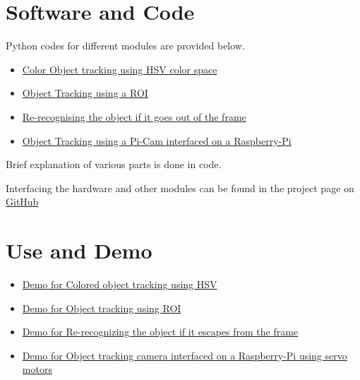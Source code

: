 \documentclass[a4paper,12pt,oneside]{book}
\begin{document}
\section{Software and Code}
Python codes for different modules are provided below.
\begin{itemize}
    \item \href{https://github.com/eYSIP-2016/Object-Tracking-Camera/blob/master/Tutorials/1.%20Colored%20object%20tracking%20using%20HSV/Colored_object_tracking_using_HSV.py}{Color Object tracking using HSV color space}
    \item \href{https://github.com/eYSIP-2016/Object-Tracking-Camera/blob/master/Tutorials/2.%20Object%20tracking%28Based%20on%20ROI%29/Colored_Object_tracking_based_on_ROI_selection.py}{Object Tracking using a ROI}
    \item \href{https://github.com/eYSIP-2016/Object-Tracking-Camera/blob/master/Tutorials/4.%20Re-recognizing%20the%20object%20if%20it%20escapes%20and%20comes%20back%20into%20the%20frame.%20Tutorial%20on%20algorithm%20used/code.py}{Re-recognising the object if it goes out of the frame}
    \item \href{https://github.com/eYSIP-2016/Object-Tracking-Camera/blob/master/Tutorials/6.%20Object%20%20Tracking%20using%20a%20Pi-Cam%20interfaced%20on%20a%20Raspberry-Pi/code.py}{Object Tracking using a Pi-Cam interfaced on a Raspberry-Pi}
\end{itemize}
Brief explanation of various parts is done in code.

Interfacing the hardware and other modules can be found in the project page on \href{https://github.com/eYSIP-2016/Object-Tracking-Camera}{GitHub}

\section{Use and Demo}
\begin{itemize}
    \item \href{https://youtu.be/hWcxEkWLm9o}{Demo for Colored object tracking using HSV }
    \item \href{https://youtu.be/bytE1EegAfg}{Demo for Object tracking using ROI}
    \item \href {https://youtu.be/M2SsABMLuCQ}{Demo for Re-recognizing the object if it escapes from the frame}
    \item \href{https://youtu.be/8CXhzPhfl64}{Demo for Object tracking camera interfaced on a Raspberry-Pi using servo motors}
\end{itemize}
\end{document}
